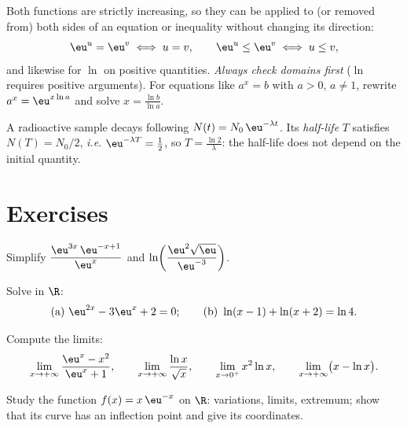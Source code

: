 \begin{method}\label{met:tle:exp:equations}
Both functions are strictly increasing, so they can be applied to (or removed
from) both sides of an equation or inequality without changing its direction:
\[
\eu^{u} = \eu^{v} \iff u = v, \qquad
\eu^{u} \leq \eu^{v} \iff u \leq v,
\]
and likewise for $\ln$ on positive quantities. \emph{Always check domains
first} ($\ln$ requires positive arguments). For equations like
$a^x = b$ with $a>0$, $a \neq 1$, rewrite $a^x = \eu^{x\ln a}$ and solve
$x = \frac{\ln b}{\ln a}$.
\end{method}

\begin{example}\label{ex:tle:exp:halflife}
A radioactive sample decays following $N(t) = N_0\,\eu^{-\lambda t}$. Its
\emph{half-life} $T$ satisfies $N(T) = N_0/2$, \emph{i.e.}
$\eu^{-\lambda T} = \frac12$, so $T = \frac{\ln 2}{\lambda}$: the half-life
does not depend on the initial quantity.
\end{example}

\section{Exercises}

\begin{exercise}[$\star$]\label{exo:tle:exp:1}
Simplify
$\dfrac{\eu^{3x}\,\eu^{-x+1}}{\eu^{x}}$ and
$\ln\!\left(\dfrac{\eu^2\sqrt{\eu}}{\eu^{-3}}\right)$.
\end{exercise}

\begin{exercise}[$\star$]\label{exo:tle:exp:2}
Solve in $\R$:
\[
\text{(a) } \eu^{2x} - 3\eu^{x} + 2 = 0;
\qquad
\text{(b) } \ln(x - 1) + \ln(x + 2) = \ln 4 .
\]
\end{exercise}

\begin{exercise}[$\star$]\label{exo:tle:exp:3}
Compute the limits:
\[
\lim_{x\to+\infty} \frac{\eu^x - x^2}{\eu^x + 1}, \qquad
\lim_{x\to+\infty} \frac{\ln x}{\sqrt x}, \qquad
\lim_{x\to0^+} x^2 \ln x, \qquad
\lim_{x\to+\infty} \bigl(x - \ln x\bigr).
\]
\end{exercise}

\begin{exercise}[$\star\star$]\label{exo:tle:exp:4}
Study the function $f(x) = x\,\eu^{-x}$ on $\R$: variations, limits,
extremum; show that its curve has an inflection point and give its
coordinates.
\end{exercise}

